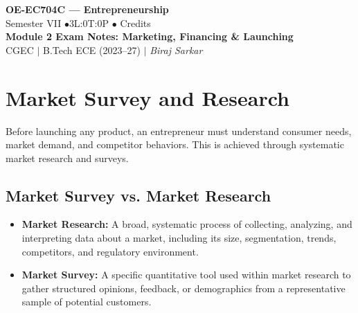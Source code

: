 \documentclass[12pt,a4paper]{article}
\begin{document}

\begin{center}
  {\LARGE\bfseries\color{myred} OE-EC704C --- Entrepreneurship}\\[5pt]
  {\normalsize\color{mydark} Semester VII \quad$\bullet$\quad 3L:0T:0P \quad$\bullet$ Credits}\\[3pt]
  {\normalsize\color{myteal}\textbf{Module 2 Exam Notes: Marketing, Financing \& Launching}}\\[3pt]
  {\small\color{mydark} CGEC \;$|$\; B.Tech ECE (2023--27) \;$|$\; \textit{Biraj Sarkar}}
\end{center}
\vspace{2pt}
\noindent{\color{myred}\rule{\linewidth}{1.5pt}}
\vspace{2pt}

\hypersetup{linkcolor=mydark}
\tableofcontents
\hypersetup{linkcolor=myteal}
\newpage

\section{Market Survey and Research}

Before launching any product, an entrepreneur must understand consumer needs, market demand, and competitor behaviors. This is achieved through systematic market research and surveys.

\subsection{Market Survey vs. Market Research}
\begin{itemize}[leftmargin=*, itemsep=3pt]
  \item \textbf{Market Research:} A broad, systematic process of collecting, analyzing, and interpreting data about a market, including its size, segmentation, trends, competitors, and regulatory environment.
  \item \textbf{Market Survey:} A specific quantitative tool used within market research to gather structured opinions, feedback, or demographics from a representative sample of potential customers.
\end{itemize}
\end{document}
